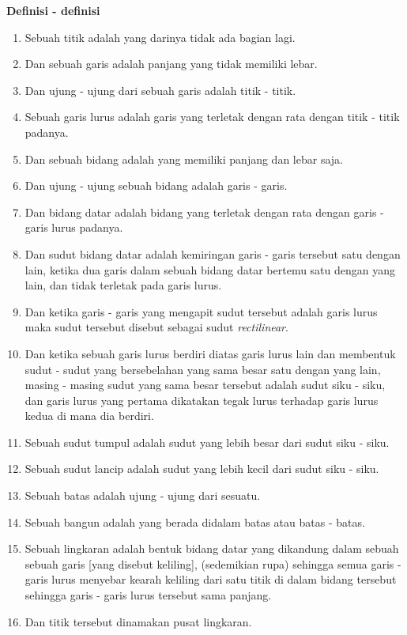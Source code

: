 \documentclass[a4paper]{book}
\begin{document}
\begin{center}
\textbf{Definisi - definisi}
\end{center} 
\begin{enumerate}
\item Sebuah titik adalah yang darinya tidak ada bagian lagi.
\item Dan sebuah garis adalah panjang yang tidak memiliki lebar.
\item Dan ujung - ujung dari sebuah garis adalah titik - titik.
\item Sebuah garis lurus adalah garis yang terletak dengan rata dengan titik - titik padanya.
\item Dan sebuah bidang adalah yang memiliki panjang dan lebar saja.
\item Dan ujung - ujung sebuah bidang adalah garis - garis.
\item Dan bidang datar adalah bidang yang terletak dengan rata dengan garis - garis lurus padanya.
\item Dan sudut bidang datar adalah kemiringan garis - garis tersebut 
satu dengan lain, ketika dua garis dalam sebuah bidang datar bertemu satu dengan
yang lain, dan tidak terletak pada garis lurus.
\item Dan ketika garis - garis yang mengapit sudut tersebut adalah garis lurus maka sudut
tersebut disebut sebagai sudut \textit{rectilinear}.
\item Dan ketika sebuah garis lurus berdiri diatas garis lurus lain dan 
membentuk sudut - sudut yang bersebelahan yang sama besar satu dengan yang 
lain, masing - masing sudut yang sama besar tersebut adalah sudut siku - siku,
dan garis lurus yang pertama dikatakan tegak lurus terhadap garis lurus kedua
di mana dia berdiri.
\item Sebuah sudut tumpul adalah sudut yang lebih besar dari sudut siku - siku.
\item Sebuah sudut lancip adalah sudut yang lebih kecil dari sudut siku - siku.
\item Sebuah batas adalah ujung - ujung dari sesuatu.
\item Sebuah bangun adalah yang berada didalam batas atau batas - batas.
\item Sebuah lingkaran adalah bentuk bidang datar yang dikandung dalam sebuah 
sebuah garis [yang disebut keliling], (sedemikian rupa) sehingga semua 
garis - garis lurus menyebar kearah keliling dari satu titik di dalam bidang
tersebut sehingga garis - garis lurus tersebut sama panjang.
\item Dan titik tersebut dinamakan pusat lingkaran.

\end{enumerate}
\end{document}
